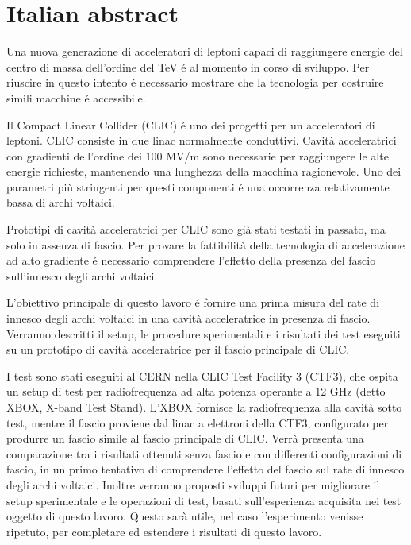 \chapter*{Italian abstract}

Una nuova generazione di acceleratori di leptoni capaci di raggiungere energie del centro di massa dell'ordine del TeV é al momento in corso di sviluppo. Per riuscire in questo intento é necessario mostrare che la tecnologia per costruire simili macchine é accessibile.

Il Compact Linear Collider (CLIC) é uno dei progetti per un acceleratori di leptoni. CLIC consiste in due linac normalmente conduttivi. Cavit\`a acceleratrici con gradienti dell'ordine dei 100 MV/m sono necessarie per raggiungere le alte energie richieste, mantenendo una lunghezza della macchina ragionevole. Uno dei parametri pi\`u stringenti per questi componenti é una occorrenza relativamente bassa di archi voltaici.

Prototipi di cavit\`a acceleratrici per CLIC sono gi\`a stati testati in passato, ma solo in assenza di fascio. Per provare la fattibilit\`a della tecnologia di accelerazione ad alto gradiente é necessario comprendere l'effetto della presenza del fascio sull'innesco degli archi voltaici.

L'obiettivo principale di questo lavoro é fornire una prima misura del rate di innesco degli archi voltaici in una cavit\`a acceleratrice in presenza di fascio. Verranno descritti il setup, le procedure sperimentali e i risultati dei test eseguiti su un prototipo di cavit\`a acceleratrice per il fascio principale di CLIC.

I test sono stati eseguiti al CERN nella CLIC Test Facility 3 (CTF3), che ospita un setup di test per radiofrequenza ad alta potenza operante a 12 GHz (detto XBOX, X-band Test Stand). L'XBOX fornisce la radiofrequenza alla cavit\`a sotto test, mentre il fascio proviene dal linac a elettroni della CTF3, configurato per produrre un fascio simile al fascio principale di CLIC. Verr\`a presenta una comparazione tra i risultati ottenuti senza fascio e con differenti configurazioni di fascio, in un primo tentativo di comprendere l'effetto del fascio sul rate di innesco degli archi voltaici. Inoltre verranno proposti sviluppi futuri per migliorare il setup sperimentale e le operazioni di test, basati sull'esperienza acquisita nei test oggetto di questo lavoro. Questo sar\`a utile, nel caso l'esperimento venisse ripetuto, per completare ed estendere i risultati di questo lavoro.